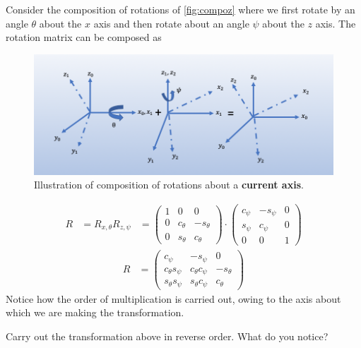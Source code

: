 Consider the composition of rotations of \autoref{fig:compoz} where we first rotate by an angle $\theta$ about the $x$ axis and then rotate about an angle $\psi$ about the $z$ axis. The rotation matrix can be composed as 
%
\begin{figure}[tb!]
	\centering
	\includegraphics[width=\columnwidth]{../lec_notes/figures/compoz.png}
	\caption{Illustration of composition of rotations about a \textbf{current axis}.}
	\label{fig:compoz}
\end{figure}
%
\begin{align}
R &= R_{x, \theta} R_{z, \psi} 
%
&= \left(\begin{array}{ccc}
1 & 0 & 0 \\
0 & c_\theta & -s_\theta \\
0 & s_\theta & c_\theta
\end{array}\right) 
%
\cdot
%
\left(\begin{array}{ccc}
c_\psi & -s_\psi & 0 \\
s_\psi & c_\psi & 0 \\
0 & 0 & 1
\end{array}\right)
\end{align}
%
\begin{align}
R	&= \left(\begin{array}{ccc}
	c_\psi & -s_\psi & 0 \\
	c_\theta s_\psi & c_\theta c_\psi &  -s_\theta \\
	s_\theta s_\psi & s_\theta c_\psi & c_\theta 
	\end{array}\right)
\end{align}
Notice how the order of multiplication is carried out, owing to the axis about which we are making the transformation. 

\noindent 
\begin{homework}
	Carry out the transformation above in reverse order. What do you notice?
\end{homework} 

